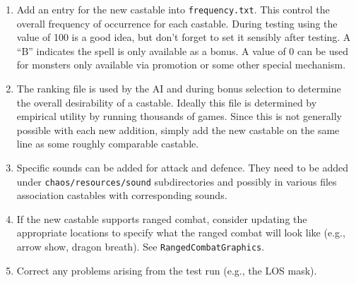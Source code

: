\documentclass{article}
\begin{document}
\begin{enumerate}
\item Add an entry for the new castable into {\tt frequency.txt}.  This control the overall frequency of occurrence for each castable. During testing using the value of 100 is a good idea, but don't forget to set it sensibly after testing. A ``B'' indicates the spell is only available as a bonus. A value of 0 can be used for monsters only available via promotion or some other special mechanism.

\item The ranking file is used by the AI and during bonus selection to determine the overall desirability of a castable. Ideally this file is determined by empirical utility by running thousands of games. Since this is not generally possible with each new addition, simply add the new castable on the same line as some roughly comparable castable.

\item Specific sounds can be added for attack and defence.  They need to be added under {\tt chaos/resources/sound} subdirectories and possibly in various files association castables with corresponding sounds.

\item If the new castable supports ranged combat, consider updating the appropriate locations to specify what the ranged combat will look like (e.g., arrow show, dragon breath). See {\tt RangedCombatGraphics}.

\item Correct any problems arising from the test run (e.g., the LOS mask).
  
  
\end{enumerate}
\end{document}
